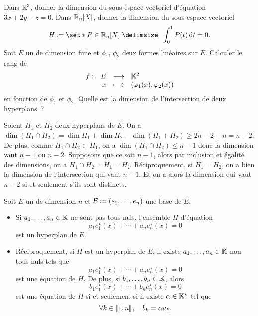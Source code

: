 \documentclass{magnolia}
\begin{document}
\begin{exos}
\exo Dans $\mathbb{R}^3$, donner la dimension du sous-espace vectoriel d'équation $3x+2y-z=0$.
\exo Dans $\polyR[n]$, donner la dimension du sous-espace vectoriel
  \[H\defeq\enstq{P\in\polyR[n]}{\integ{0}{1}{P(t)}{t}=0}.\]
\exo Soit $E$ un \Kev de dimension finie et $\phi_1$, $\phi_2$ deux formes
  linéaires sur $E$. Calculer le rang de
  \[\begin{array}[t]{lrcl} \displaystyle{f} : & \displaystyle{E} & \longrightarrow & \displaystyle{\ensuremath{\mathbb{K}}^2} \\ & \displaystyle{x} & \longmapsto & \displaystyle{\left(\varphi_1(x),\varphi_2(x)\right)} \end{array}\]
  en fonction de $\phi_1$ et $\phi_2$.
\exo Quelle est la dimension de l'intersection de deux hyperplans~?
\begin{sol}
Soient $H_1$ et $H_2$ deux hyperplans de $E$. On a $\dim(H_1\cap H_2)=\dim H_1+ \dim H_2-\dim(H_1+H_2)\geq 2n-2-n=n-2$. De plus, comme $H_1\cap H_2 \subset H_1$, on a $\dim(H_1\cap H_2)\leq n-1$ donc la dimension vaut $n-1$ ou $n-2$. Supposons que ce soit $n-1$, alors par inclusion et égalité des dimensions, on a $H_1\cap H_2=H_1=H_2$. Réciproquement, si $H_1=H_2$, on a bien la dimension de l'intersection qui vaut $n-1$. Et on a alors la dimension qui vaut $n-2$ si et seulement s'ils sont distincts.
\end{sol}
\end{exos}

\begin{proposition}[utile=1]
Soit $E$ un \Kev de dimension $n$ et $\mathcal{B}\coloneqq(e_1,\ldots,e_n)$ une base de
$E$. 
\begin{itemize}
\item Si $a_1,\ldots,a_n\in\mathbb{K}$ ne sont pas tous nuls, l'ensemble
  $H$ d'équation
  \[a_1 e_1^\star(x)+\cdots+a_n e_n^\star(x)=0\]
  est un hyperplan de $E$.
\item Réciproquement, si $H$ est un hyperplan de $E$, il existe
  $a_1,\ldots,a_n\in\mathbb{K}$ non tous nuls tels que
  \[a_1 e_1^\star(x)+\cdots+a_n e_n^\star(x)=0\]
  est une équation de $H$. De plus, si $b_1,\ldots,b_n\in\mathbb{K}$, alors
  \[b_1 e_1^\star(x)+\cdots+b_n e_n^\star(x)=0\]
  est une équation de $H$ si et seulement si il existe $\alpha\in\mathbb{K}^*$ tel que
  \[\forall k\in\left\llbracket 1,n\right\rrbracket ,\quad b_k=\alpha a_k.\]
\end{itemize}
\end{proposition}
\end{document}
